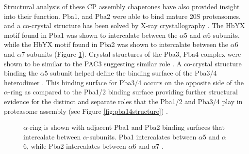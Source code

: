 	Structural analysis of these CP assembly chaperones have also provided insight into their function. Pba1, and Pba2 were able to bind mature 20S proteasomes, and a co-crystal structure has been solved by X-ray crystallography \citep{stadtmueller12}. The HbYX motif found in Pba1 was shown to intercalate between the $\alpha$5 and $\alpha$6 subunits, while the HbYX motif found in Pba2 was shown to intercalate between the $\alpha$6 and $\alpha$7 subunits (Figure \ref{fig:pba12hbyx}). Crystal structures of the Pba3, Pba4 complex were shown to be similar to the PAC3 suggesting similar role \citep{yashiroda08}. A co-crystal structure binding the $\alpha$5 subunit helped define the binding surface of the Pba3/4 heterodimer \citep{yashiroda08}. This binding surface for Pba3/4 occurs on the opposite side of the $\alpha$-ring as compared to the Pba1/2 binding surface providing further structural evidence for the distinct and separate roles that the Pba1/2 and Pba3/4 play in proteasome assembly (see Figure \ref{fig:pba14structure}) \citep{stadtmueller12, yashiroda08}.

\begin{figure}[p]
	{$\alpha$-ring is shown with adjacent Pba1 and Pba2 binding surfaces that intercalate between $\alpha$-subunits. Pba1 intercalates between $\alpha$5 and $\alpha$6, while Pba2 intercalates between $\alpha$6 and $\alpha$7 \citep{yashiroda08}.}
	\label{fig:pba12hbyx}
\end{figure}

